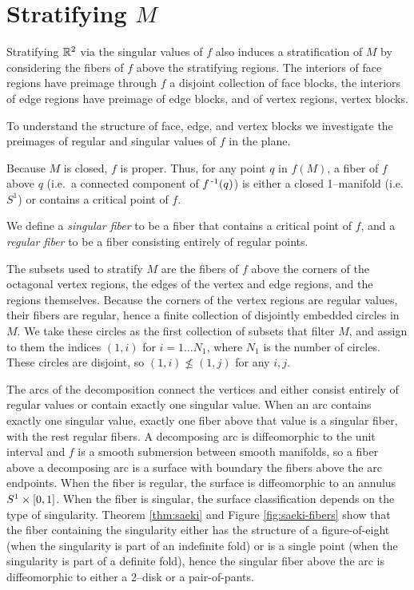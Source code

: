 \section{Stratifying $M$}

Stratifying $\mathbb{R}^2$ via the singular values of $f$ also induces a stratification of $M$
by considering the fibers of $f$ above the stratifying regions.
The interiors of face regions have preimage through $f$ a disjoint collection of face blocks, the interiors of edge regions have preimage of edge blocks, and of vertex regions, vertex blocks.

To understand the structure of face, edge, and vertex blocks we investigate the preimages of regular and singular values of $f$ in the plane.
\begin{defn}
	Because $M$ is closed, $f$ is proper.
	Thus, for any point $q$ in $f(M)$, a fiber of $f$ above $q$ (i.e.\ a connected component of $f^{\,\text{-}1}(q)$) is either a closed 1--manifold (i.e.\ $S^1$) or contains a critical point of $f$.
	
	We define a \emph{singular fiber} to be a fiber that contains a critical point of $f$, and a \emph{regular fiber} to be a fiber consisting entirely of regular points.	
\end{defn}

The subsets used to stratify $M$ are the fibers of $f$ above the corners of the octagonal vertex regions, the edges of the vertex and edge regions, and the regions themselves.
Because the corners of the vertex regions are regular values, their fibers are regular, hence a finite collection of disjointly embedded circles in $M$.
We take these circles as the first collection of subsets that filter $M$, and assign to them the indices $(1,i)$ for $i = 1\dots N_1$, where $N_1$ is the number of circles.
These circles are disjoint, so $(1,i)\nleq (1,j)$ for any $i,j$.

The arcs of the decomposition connect the vertices and either consist entirely of regular values or contain exactly one singular value.
When an arc contains exactly one singular value, exactly one fiber above that value is a singular fiber, with the rest regular fibers.
A decomposing arc is diffeomorphic to the unit interval and $f$ is a smooth submersion between smooth manifolds, so a fiber above a decomposing arc is a surface with boundary the fibers above the arc endpoints.
When the fiber is regular, the surface is diffeomorphic to an annulus $S^1\times[0,1]$.
When the fiber is singular, the surface classification depends on the type of singularity.
Theorem \ref{thm:saeki} and Figure \ref{fig:saeki-fibers} show that the fiber containing the singularity either has the structure of a figure-of-eight (when the singularity is part of an indefinite fold) or is a single point (when the singularity is part of a definite fold), hence the singular fiber above the arc is diffeomorphic to either a 2--disk or a pair-of-pants.

